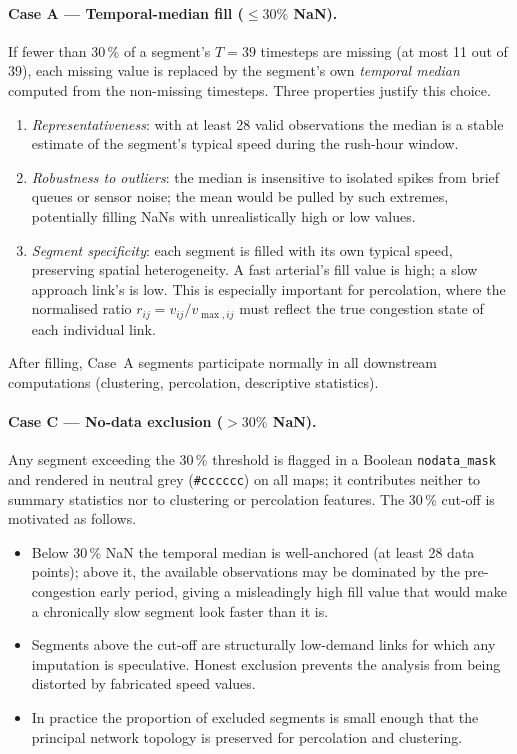 \documentclass[11pt,a4paper]{article}
\begin{document}
\paragraph{Case A --- Temporal-median fill ($\leq 30\%$ NaN).}
If fewer than 30\,\% of a segment's $T = 39$ timesteps are missing (at most
11 out of 39), each missing value is replaced by the segment's own
\emph{temporal median} computed from the non-missing timesteps.  Three
properties justify this choice.
\begin{enumerate}
  \item \emph{Representativeness}: with at least 28 valid observations the
    median is a stable estimate of the segment's typical speed during the
    rush-hour window.
  \item \emph{Robustness to outliers}: the median is insensitive to isolated
    spikes from brief queues or sensor noise; the mean would be pulled by such
    extremes, potentially filling NaNs with unrealistically high or low values.
  \item \emph{Segment specificity}: each segment is filled with its own typical
    speed, preserving spatial heterogeneity.  A fast arterial's fill value is
    high; a slow approach link's is low.  This is especially important for
    percolation, where the normalised ratio $r_{ij} = v_{ij}/v_{\max,ij}$ must
    reflect the true congestion state of each individual link.
\end{enumerate}
After filling, Case~A segments participate normally in all downstream
computations (clustering, percolation, descriptive statistics).

\paragraph{Case C --- No-data exclusion ($> 30\%$ NaN).}
Any segment exceeding the 30\,\% threshold is flagged in a Boolean
\texttt{nodata\_mask} and rendered in neutral grey (\texttt{\#cccccc}) on all
maps; it contributes neither to summary statistics nor to clustering or
percolation features.  The 30\,\% cut-off is motivated as follows.
\begin{itemize}
  \item Below 30\,\% NaN the temporal median is well-anchored (at least 28
    data points); above it, the available observations may be dominated by
    the pre-congestion early period, giving a misleadingly high fill value
    that would make a chronically slow segment look faster than it is.
  \item Segments above the cut-off are structurally low-demand links for
    which any imputation is speculative.  Honest exclusion prevents the
    analysis from being distorted by fabricated speed values.
  \item In practice the proportion of excluded segments is small enough that
    the principal network topology is preserved for percolation and clustering.
\end{itemize}
\end{document}
